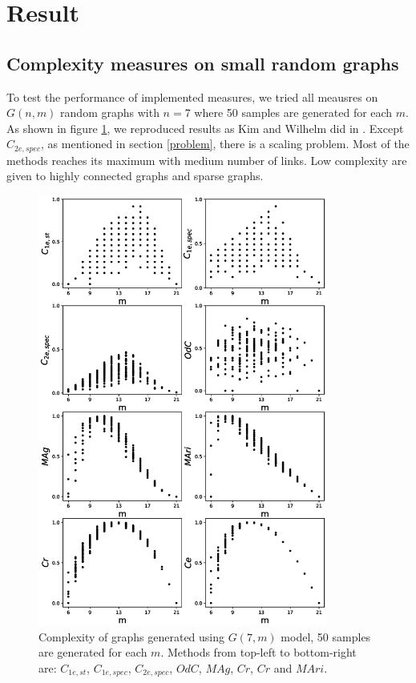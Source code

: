 \documentclass[12pt]{article}
\begin{document}
\section{Result}
\subsection{Complexity measures on small random graphs}
\label{complexity}
To test the performance of implemented measures, we tried all meausres on $G(n,m)$ random graphs with $n=7$ where 50 samples are generated for each $m$. As shown in figure \ref{fig:small_graphs}, we reproduced results as Kim and Wilhelm did in \cite{KIM20082637}. Except $C_{2e,spec}$, as mentioned in section \ref{problem}, there is a scaling problem. Most of the methods reaches its maximum with medium number of links. Low complexity are given to highly connected graphs and sparse graphs.
\clearpage
\newpage
\begin{figure}[p!]
    \includegraphics[width=0.85\textwidth]{complexities.eps}
    \vspace*{-0.8in}
    \centering
    \caption{Complexity of graphs generated using $G(7,m)$ model, 50 samples are generated for each $m$. Methods from top-left to bottom-right are: $C_{1e,st}$, $C_{1e,spec}$, $C_{2e,spec}$, $OdC$, $MAg$, $Cr$, $Cr$ and $MAri$.}
    \label{fig:small_graphs}
    \clearpage
\end{figure}
\end{document}
